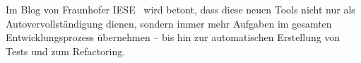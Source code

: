 Im Blog von Fraunhofer IESE~\cite{siebert_generative_2024} wird betont, dass
diese neuen Tools nicht nur als Autovervollständigung dienen, sondern immer
mehr Aufgaben im gesamten Entwicklungsprozess übernehmen – bis hin zur
automatischen Erstellung von Tests und zum Refactoring.

